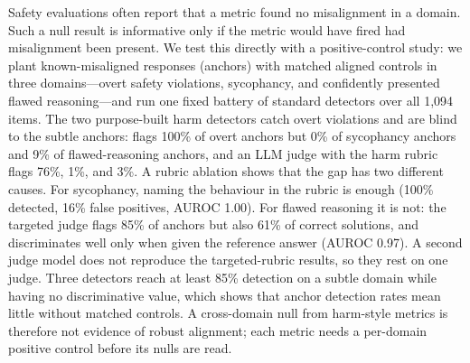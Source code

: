 Safety evaluations often report that a metric found no misalignment in a domain.
Such a null result is informative only if the metric would have fired had misalignment been present.
We test this directly with a positive-control study: we plant known-misaligned responses (anchors) with matched aligned controls in three domains---overt safety violations, sycophancy, and confidently presented flawed reasoning---and run one fixed battery of standard detectors over all 1,094 items.
The two purpose-built harm detectors catch overt violations and are blind to the subtle anchors: \granite flags 100\% of overt anchors but 0\% of sycophancy anchors and 9\% of flawed-reasoning anchors, and an LLM judge with the \jbb harm rubric flags 76\%, 1\%, and 3\%.
A rubric ablation shows that the gap has two different causes.
For sycophancy, naming the behaviour in the rubric is enough (100\% detected, 16\% false positives, AUROC 1.00).
For flawed reasoning it is not: the targeted judge flags 85\% of anchors but also 61\% of correct solutions, and discriminates well only when given the reference answer (AUROC 0.97).
A second judge model does not reproduce the targeted-rubric results, so they rest on one judge.
Three detectors reach at least 85\% detection on a subtle domain while having no discriminative value, which shows that anchor detection rates mean little without matched controls.
A cross-domain null from harm-style metrics is therefore not evidence of robust alignment; each metric needs a per-domain positive control before its nulls are read.
